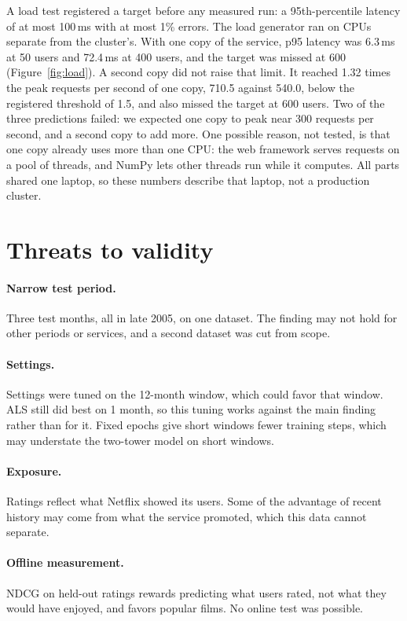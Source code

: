 \documentclass[11pt]{article}
\begin{document}
A load test registered a target before any measured run: a 95th-percentile latency of at most
100\,ms with at most 1\% errors. The load generator ran on CPUs separate from the cluster's. With
one copy of the service, p95 latency was 6.3\,ms at 50 users and 72.4\,ms at 400 users, and the
target was missed at 600 (Figure~\ref{fig:load}). A second copy did not raise that limit. It
reached 1.32 times the peak requests per second of one copy, 710.5 against 540.0, below the
registered threshold of 1.5, and also missed the target at 600 users. Two of the three
predictions failed: we expected one copy to peak near 300 requests per second, and a second copy
to add more. One possible reason, not tested, is that one copy already uses more than one CPU:
the web framework serves requests on a pool of threads, and NumPy lets other threads run while it
computes. All parts shared one
laptop, so these numbers describe that laptop, not a production cluster.

\section{Threats to validity}

\paragraph{Narrow test period.} Three test months, all in late 2005, on one dataset. The finding
may not hold for other periods or services, and a second dataset was cut from scope.
\paragraph{Settings.} Settings were tuned on the 12-month window, which could favor that window.
ALS still did best on 1 month, so this tuning works against the main finding rather than for it.
Fixed epochs give short windows fewer training steps, which may understate the two-tower model on
short windows.
\paragraph{Exposure.} Ratings reflect what Netflix showed its users. Some of the advantage of
recent history may come from what the service promoted, which this data cannot separate.
\paragraph{Offline measurement.} NDCG on held-out ratings rewards predicting what users rated, not
what they would have enjoyed, and favors popular films. No online test was possible.
\end{document}
